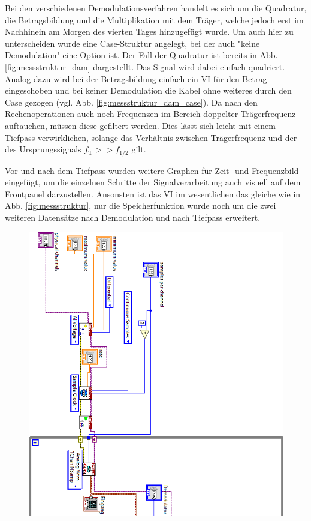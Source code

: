 		Bei den verschiedenen Demodulationsverfahren handelt es sich um die Quadratur, die Betragsbildung und die Multiplikation mit dem Träger, welche jedoch erst im Nachhinein am Morgen des vierten Tages hinzugefügt wurde.
		Um auch hier zu unterscheiden wurde eine Case-Struktur angelegt, bei der auch "keine Demodulation" eine Option ist.
		Der Fall der Quadratur ist bereits in Abb. \ref{fig:messstruktur_dam} dargestellt.
		Das Signal wird dabei einfach quadriert.
		Analog dazu wird bei der Betragsbildung einfach ein VI für den Betrag eingeschoben und bei keiner Demodulation die Kabel ohne weiteres durch den Case gezogen (vgl. Abb. \ref{fig:messstruktur_dam_case}). 
		Da nach den Rechenoperationen auch noch Frequenzen im Bereich doppelter Trägerfrequenz auftauchen, müssen diese gefiltert werden.
		Dies lässt sich leicht mit einem Tiefpass verwirklichen, solange das Verhältnis zwischen Trägerfrequenz und der des Ursprungssignals $f_\text{T} >> f_{1/2}$ gilt.
		
		Vor und nach dem Tiefpass wurden weitere Graphen für Zeit- und Frequenzbild eingefügt, um die einzelnen Schritte der Signalverarbeitung auch visuell auf dem Frontpanel darzustellen.
		Ansonsten ist das VI im wesentlichen das gleiche wie in Abb. \ref{fig:messstruktur}, nur die Speicherfunktion wurde noch um die zwei weiteren Datensätze nach Demodulation und nach Tiefpass erweitert.
		
		\newpage
		\pagestyle{empty}
		
		\begin{figure}[H]
			\centering
			\includegraphics[width=\textwidth]{pic/messstruktur_dam1.png}
		\end{figure} 
	
